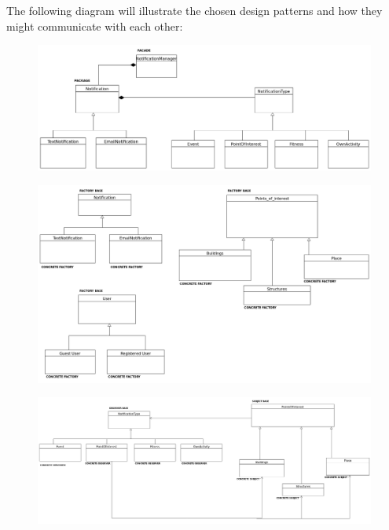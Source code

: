 \documentclass{article}
\begin{document}
The following diagram will illustrate the chosen design patterns and how they might communicate with each other:
	\FloatBarrier	
	\begin{figure}
  		\includegraphics[width=\textwidth]{Images/Facade.png}
	\end{figure}
	\begin{figure}
  		\includegraphics[width=\textwidth]{Images/Factory.png}
	\end{figure}
	\begin{figure}
  		\includegraphics[width=\textwidth]{Images/Observer.png}
	\end{figure}
\end{document}
